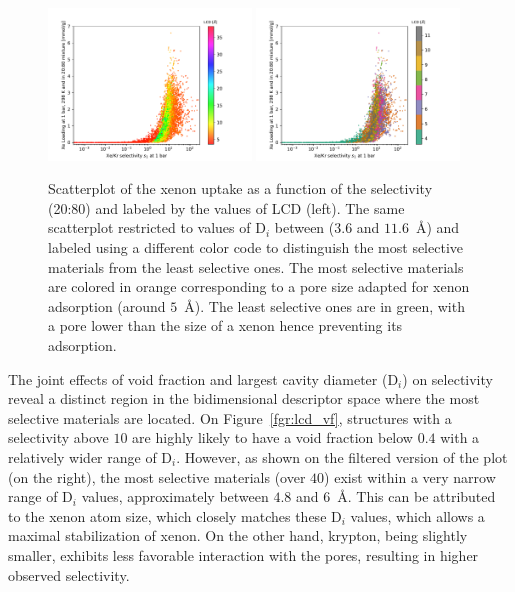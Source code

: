 \documentclass[main.tex]{subfiles}
\begin{document}
\begin{figure}[ht!]
  \centering
  \includegraphics[width=0.48\textwidth]{figures/2-thermo/Scatterplot_uptake_selectivity_lcd.pdf}
  \hfill
  \includegraphics[width=0.48\textwidth]{figures/2-thermo/Scatterplot_uptake_selectivity_lcd_zoom.pdf}
  \caption{Scatterplot of the xenon uptake as a function of the selectivity (20:80) and labeled by the values of LCD (left). The same scatterplot restricted to values of D$_i$ between ($3.6$ and $11.6$~\si{\angstrom}) and labeled using a different color code to distinguish the most selective materials from the least selective ones. The most selective materials are colored in orange corresponding to a pore size adapted for xenon adsorption (around $5$~\si{\angstrom}). The least selective ones are in green, with a pore lower than the size of a xenon hence preventing its adsorption.}\label{fgr:lcd}
\end{figure}

The joint effects of void fraction and largest cavity diameter (D$_i$) on selectivity reveal a distinct region in the bidimensional descriptor space where the most selective materials are located. On Figure~\ref{fgr:lcd_vf}, structures with a selectivity above $10$ are highly likely to have a void fraction below $0.4$ with a relatively wider range of D$_i$. However, as shown on the filtered version of the plot (on the right), the most selective materials (over $40$) exist within a very narrow range of D$_i$ values, approximately between $4.8$ and $6$~\si{\angstrom}. This can be attributed to the xenon atom size, which closely matches these D$_i$ values, which allows a maximal stabilization of xenon. On the other hand, krypton, being slightly smaller, exhibits less favorable interaction with the pores, resulting in higher observed selectivity. 
\end{document}
